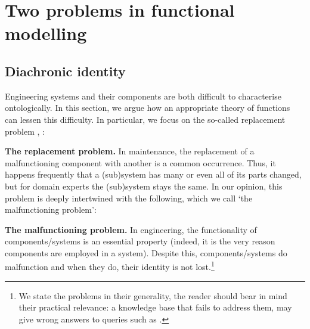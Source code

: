 \documentclass[
]{ceurart}
\begin{document}
\section{Two problems in functional modelling}

\subsection{Diachronic identity}\label{subsec:identity}
Engineering systems and their components are both difficult to characterise ontologically. %
In this section, we argue how an appropriate theory of functions can lessen this difficulty. %
In particular, we focus on the so-called replacement problem \cite{guarinoArtefactualSystemsMissing2014},  \cite[Chapter 14]{westDevelopingHighQuality2011}:
\bflist
\item[\mypb{replacement}] \textbf{The replacement problem.} In maintenance, the replacement of a malfunctioning component
with another is a common occurrence. Thus, it happens frequently that a (sub)system has many or even all of its parts changed, but for domain experts the (sub)system stays the same. 
\eflist
In our opinion, this problem is deeply intertwined with the following, which we call `the malfunctioning problem':
\bflist
\item[\mypb{malfunctioning}] \textbf{The malfunctioning problem.} In engineering, the functionality of components/systems is an essential property (indeed, it is the very reason components are employed in a system). Despite this, components/systems do malfunction and when they do, their identity is not lost.\footnote{We state the problems in their generality, the reader should bear in mind their practical relevance: a knowledge base that fails to address them, may give wrong answers to queries such as .} 
\end{document}
